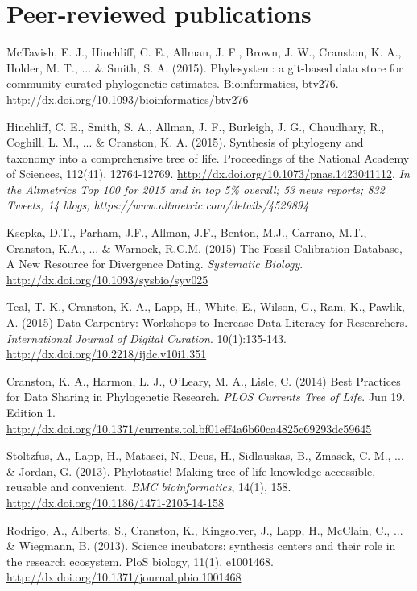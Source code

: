 \documentclass[10pt]{article}
\begin{document}
\section*{Peer-reviewed publications}

McTavish, E. J., Hinchliff, C. E., Allman, J. F., Brown, J. W., Cranston, K. A., Holder, M. T., ... \& Smith, S. A. (2015). Phylesystem: a git-based data store for community curated phylogenetic estimates. Bioinformatics, btv276. \url{http://dx.doi.org/10.1093/bioinformatics/btv276} 

Hinchliff, C. E., Smith, S. A., Allman, J. F., Burleigh, J. G., Chaudhary, R., Coghill, L. M., ... \& Cranston, K. A. (2015). Synthesis of phylogeny and taxonomy into a comprehensive tree of life. Proceedings of the National Academy of Sciences, 112(41), 12764-12769. \url{http://dx.doi.org/10.1073/pnas.1423041112}. \textit{In the Altmetrics Top 100 for 2015 and in top 5\% overall; 53 news reports; 832 Tweets, 14 blogs; https://www.altmetric.com/details/4529894}

Ksepka, D.T., Parham, J.F., Allman, J.F., Benton, M.J., Carrano, M.T., Cranston, K.A., ... \& Warnock, R.C.M. (2015) The Fossil Calibration Database, A New Resource for Divergence Dating. \textit{Systematic Biology}. \url{http://dx.doi.org/10.1093/sysbio/syv025}

Teal, T. K., Cranston, K. A., Lapp, H., White, E., Wilson, G., Ram, K., Pawlik, A. (2015) Data Carpentry: Workshops to Increase Data Literacy for Researchers. \textit{International Journal of Digital Curation}. 10(1):135-143. \url{http://dx.doi.org/10.2218/ijdc.v10i1.351}
 
Cranston, K. A., Harmon, L. J., O'Leary, M. A., Lisle, C. (2014) Best Practices for Data Sharing in Phylogenetic Research. \textit{PLOS Currents Tree of Life}. Jun 19. Edition 1. \url{http://dx.doi.org/10.1371/currents.tol.bf01eff4a6b60ca4825c69293dc59645} 

Stoltzfus, A., Lapp, H., Matasci, N., Deus, H., Sidlauskas, B., Zmasek, C. M., ... \& Jordan, G. (2013). Phylotastic! Making tree-of-life knowledge accessible, reusable and convenient. \textit{BMC bioinformatics}, 14(1), 158. \url{http://dx.doi.org/10.1186/1471-2105-14-158} 

Rodrigo, A., Alberts, S., Cranston, K., Kingsolver, J., Lapp, H., McClain, C., ... \& Wiegmann, B. (2013). Science incubators: synthesis centers and their role in the research ecosystem. PloS biology, 11(1), e1001468. \url{http://dx.doi.org/10.1371/journal.pbio.1001468} 
\end{document}
